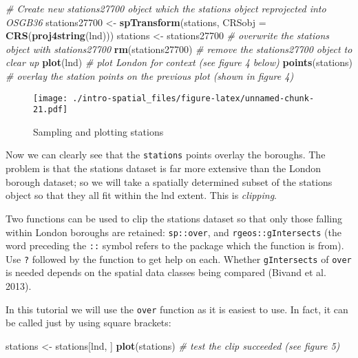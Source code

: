 \documentclass[]{article}
\newenvironment{Shaded}{}{}
\newcommand{\KeywordTok}[1]{\textcolor[rgb]{0.00,0.44,0.13}{\textbf{{#1}}}}
\newcommand{\DataTypeTok}[1]{\textcolor[rgb]{0.56,0.13,0.00}{{#1}}}
\newcommand{\StringTok}[1]{\textcolor[rgb]{0.25,0.44,0.63}{{#1}}}
\newcommand{\CommentTok}[1]{\textcolor[rgb]{0.38,0.63,0.69}{\textit{{#1}}}}
\newcommand{\NormalTok}[1]{{#1}}
\begin{document}
\begin{Shaded}
\begin{Highlighting}[]
\CommentTok{# Create new stations27700 object which the stations object reprojected into OSGB36}
\NormalTok{stations27700 <-}\StringTok{ }\KeywordTok{spTransform}\NormalTok{(stations, }\DataTypeTok{CRSobj =} \KeywordTok{CRS}\NormalTok{(}\KeywordTok{proj4string}\NormalTok{(lnd)))}
\NormalTok{stations <-}\StringTok{ }\NormalTok{stations27700 }\CommentTok{# overwrite the stations object with stations27700}
\KeywordTok{rm}\NormalTok{(stations27700) }\CommentTok{# remove the stations27700 object to clear up}
\KeywordTok{plot}\NormalTok{(lnd) }\CommentTok{# plot London for context (see figure 4 below)}
\KeywordTok{points}\NormalTok{(stations) }\CommentTok{# overlay the station points on the previous plot (shown in figure 4)}
\end{Highlighting}
\end{Shaded}

\begin{figure}[htbp]
\centering
\texttt{[image: ./intro-spatial\_files/figure-latex/unnamed-chunk-21.pdf]}
\caption{Sampling and plotting stations}
\end{figure}

Now we can clearly see that the \texttt{stations} points overlay the
boroughs. The problem is that the stations dataset is far more extensive
than the London borough dataset; so we will take a spatially determined
subset of the stations object so that they all fit within the lnd
extent. This is \emph{clipping}.

Two functions can be used to clip the stations dataset so that only
those falling within London boroughs are retained: \texttt{sp::over},
and \texttt{rgeos::gIntersects} (the word preceding the \texttt{::}
symbol refers to the package which the function is from). Use \texttt{?}
followed by the function to get help on each. Whether
\texttt{gIntersects} of \texttt{over} is needed depends on the spatial
data classes being compared (Bivand et al. 2013).

In this tutorial we will use the \texttt{over} function as it is easiest
to use. In fact, it can be called just by using square brackets:

\begin{Shaded}
\begin{Highlighting}[]
\NormalTok{stations <-}\StringTok{ }\NormalTok{stations[lnd, ]}
\KeywordTok{plot}\NormalTok{(stations) }\CommentTok{# test the clip succeeded (see figure 5)}
\end{Highlighting}
\end{Shaded}
\end{document}
